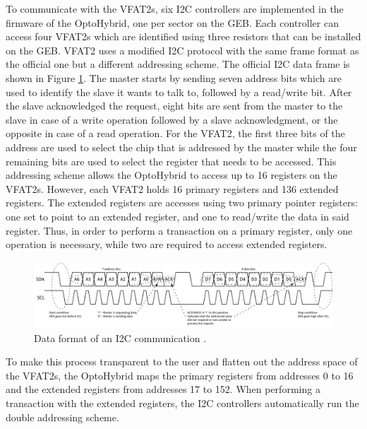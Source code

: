       To communicate with the VFAT2s, six I2C controllers are implemented in the firmware of the OptoHybrid, one per sector on the GEB. Each controller can access four VFAT2s which are identified using three resistors that can be installed on the GEB. VFAT2 uses a modified I2C protocol with the same frame format as the official one but a different addressing scheme. The official I2C data frame is shown in Figure \ref{fig:II-3-i2c}. The master starts by sending seven address bits which are used to identify the slave it wants to talk to, followed by a read/write bit. After the slave acknowledged the request, eight bits are sent from the master to the slave in case of a write operation followed by a slave acknowledgment, or the opposite in case of a read operation. For the VFAT2, the first three bits of the address are used to select the chip that is addressed by the master while the four remaining bits are used to select the register that needs to be accessed. This addressing scheme allows the OptoHybrid to access up to 16 registers on the VFAT2s. However, each VFAT2 holds 16 primary registers and 136 extended registers. The extended registers are accesses using two primary pointer registers: one set to point to an extended register, and one to read/write the data in said register. Thus, in order to perform a transaction on a primary register, only one operation is necessary, while two are required to access extended registers. \\

      \begin{figure}[h!]
        \centering
        \includegraphics[width=\textwidth]{img/II-3-test-beam/i2c.png}
        \caption{Data format of an I2C communication \cite{I2C}.}
        \label{fig:II-3-i2c}
      \end{figure}

      To make this process transparent to the user and flatten out the address space of the VFAT2s, the OptoHybrid maps the primary registers from addresses 0 to 16 and the extended registers from addresses 17 to 152. When performing a transaction with the extended registers, the I2C controllers automatically run the double addressing scheme. \\

